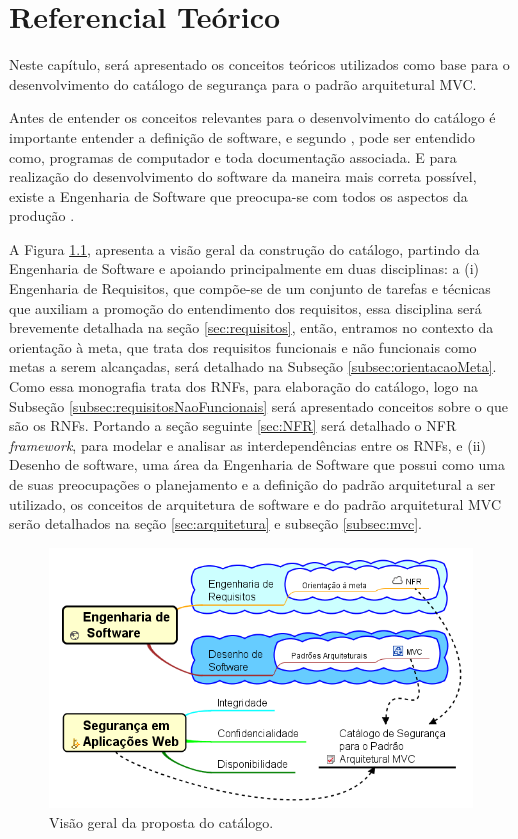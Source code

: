 \chapter[Referencial Teórico]{Referencial Teórico}
\label{chap:referencialTeorico}

Neste capítulo, será apresentado os conceitos teóricos utilizados como base para o desenvolvimento do catálogo de segurança para o padrão arquitetural MVC.

Antes de entender os conceitos relevantes para o desenvolvimento do catálogo é importante entender a definição de software, e segundo \cite{sommerville2003engenharia}, pode ser entendido como, programas de computador e toda documentação associada. E para realização do desenvolvimento do software da maneira mais correta possível, existe a Engenharia de Software que preocupa-se com todos os aspectos da produção \cite{sommerville2003engenharia}. 

A Figura \ref{BigPicture}, apresenta a visão geral da construção do catálogo, partindo da Engenharia de Software e apoiando principalmente em duas disciplinas: a (i) Engenharia de Requisitos, que compõe-se de um conjunto de tarefas e técnicas que auxiliam a promoção do entendimento dos requisitos, essa disciplina será brevemente detalhada na seção \ref{sec:requisitos}, então, entramos no contexto da orientação à meta, que trata dos requisitos funcionais e não funcionais como metas a serem alcançadas, será detalhado na Subseção \ref{subsec:orientacaoMeta}. Como essa monografia trata dos RNFs, para elaboração do catálogo, logo na Subseção \ref{subsec:requisitosNaoFuncionais} será apresentado conceitos sobre o que são os RNFs. Portando a seção seguinte \ref{sec:NFR} será detalhado o NFR \textit{framework}, para modelar e analisar as interdependências entre os RNFs, e (ii) Desenho de software, uma área da Engenharia de Software que possui como uma de suas preocupações o planejamento e a definição do padrão arquitetural a ser utilizado, os conceitos de arquitetura de software e do padrão arquitetural MVC serão detalhados na seção \ref{sec:arquitetura} e subseção \ref{subsec:mvc}.

\begin{figure}[h!]
	\centering
	\includegraphics[keepaspectratio=true,scale=0.65]{figuras/bigPicture.png}
	\caption{Visão geral da proposta do catálogo.}
	\label{BigPicture}
\end{figure}

